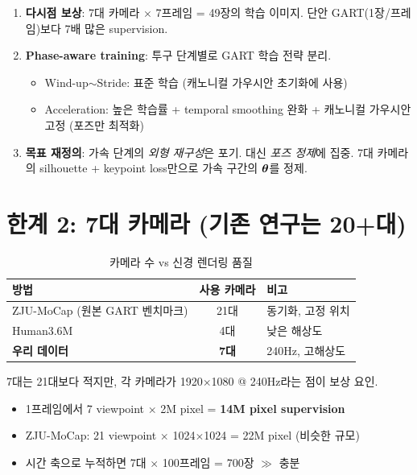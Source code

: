 \documentclass[11pt, a4paper]{report}
\begin{document}
\begin{enumerate}[leftmargin=*]
  \item \textbf{다시점 보상}: 7대 카메라 $\times$ 7프레임 = 49장의 학습 이미지. 단안 GART(1장/프레임)보다 7배 많은 supervision.

  \item \textbf{Phase-aware training}: 투구 단계별로 GART 학습 전략 분리.
  \begin{itemize}
    \item Wind-up$\sim$Stride: 표준 학습 (캐노니컬 가우시안 초기화에 사용)
    \item Acceleration: 높은 학습률 + temporal smoothing 완화 + 캐노니컬 가우시안 고정 (포즈만 최적화)
  \end{itemize}

  \item \textbf{목표 재정의}: 가속 단계의 \textit{외형 재구성}은 포기. 대신 \textit{포즈 정제}에 집중.
  7대 카메라의 silhouette + keypoint loss만으로 가속 구간의 $\bm{\theta}$를 정제.
\end{enumerate}


\section{한계 2: 7대 카메라 (기존 연구는 20+대)}

\begin{table}[H]
\centering
\caption{카메라 수 vs 신경 렌더링 품질}
\renewcommand{\arraystretch}{1.3}
\begin{tabular}{l c l}
\toprule
\textbf{방법} & \textbf{사용 카메라} & \textbf{비고} \\
\midrule
ZJU-MoCap (원본 GART 벤치마크) & 21대 & 동기화, 고정 위치 \\
Human3.6M & 4대 & 낮은 해상도 \\
\textbf{우리 데이터} & \textbf{7대} & 240Hz, 고해상도 \\
\bottomrule
\end{tabular}
\end{table}

\begin{keyidea}
7대는 21대보다 적지만, 각 카메라가 1920$\times$1080 @ 240Hz라는 점이 보상 요인.
\begin{itemize}[leftmargin=*]
  \item 1프레임에서 7 viewpoint $\times$ 2M pixel = \textbf{14M pixel supervision}
  \item ZJU-MoCap: 21 viewpoint $\times$ 1024$\times$1024 = 22M pixel (비슷한 규모)
  \item 시간 축으로 누적하면 7대 $\times$ 100프레임 = 700장 $\gg$ 충분
\end{itemize}
\end{keyidea}
\end{document}
